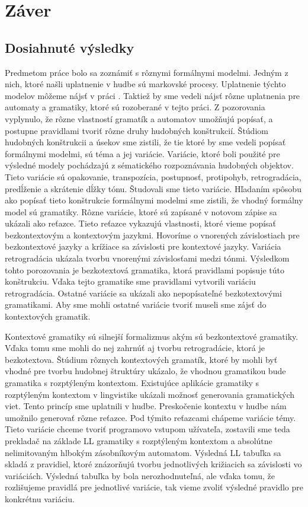\chapter{Záver}
\label{chap:end}
\section{Dosiahnuté výsledky}
Predmetom práce bolo sa zoznámiť s rôznymi formálnymi modelmi. Jedným z nich, ktoré našli uplatnenie v hudbe sú markovské procesy. Uplatnenie týchto modelov môžeme nájsť v práci \cite{afrpub}. Taktiež by sme vedeli nájsť rôzne uplatnenia pre automaty a gramatiky, ktoré sú rozoberané v tejto práci. Z pozorovania vyplynulo, že rôzne vlastností gramatík a automatov umožňujú popísať, a postupne pravidlami tvoriť rôzne druhy hudobných konštrukcií. 
Štúdiom hudobných konštrukcii a úsekov sme zistili, že tie ktoré by sme vedeli popísať formálnymi modelmi, sú téma a jej variácie. Variácie, ktoré boli použité pre výsledné modely pochádzajú z sématického rozpoznávania hudobných objektov. Tieto variácie sú opakovanie, transpozícia, postupnosť, protipohyb, retrogradácia, predĺženie a skrátenie dĺžky tónu. Študovali sme tieto variácie. Hľadaním spôsobu ako popísať tieto konštrukcie formálnymi modelmi sme zistili, že vhodný formálny model sú gramatiky. Rôzne variácie, ktoré sú zapísané v notovom zápise sa ukázali ako reťazce. Tieto reťazce vykazujú vlastnosti, ktoré vieme popísať bezkontextovým a kontextovým jazykmi. Hovoríme o vnorených závislostiach pre bezkontextové jazyky a krížiace sa závislosti pre kontextové jazyky. Variácia retrogradácia ukázala tvorbu vnorenými závislosťami medzi tónmi. Výsledkom tohto porozovania je bezkotextová gramatika, ktorá pravidlami popisuje túto konštrukciu. Vďaka tejto gramatike sme pravidlami vytvorili variáciu retrogradácia. Ostatné variácie sa ukázali ako nepopísateľné bezkotextovými gramatikami. Aby sme mohli ostatné variácie tvoriť museli sme zájsť do kontextových gramatik.

Kontextové gramatiky sú silnejší formalizmus akým sú bezkontextové gramatiky. Vďaka tomu sme mohli do nej zahrnúť aj tvorbu retrogradácie, ktorá je bezkotextova. Štúdium rôznych kontextových gramatík, ktoré by mohli byť vhodné pre tvorbu hudobnej štruktúry ukázalo, že vhodnou gramatikou bude gramatika s rozptýleným kontextom. Existujúce aplikácie gramatiky s rozptýleným kontextom v lingvistike ukázali možnosť generovania gramatických viet. Tento princíp sme uplatnili v hudbe. Preskočenie kontextu v hudbe nám umožnilo generovať rôzne reťazce. Pod týmito reťazcami chápeme variácie témy. Tieto variácie chceme tvoriť programovo vstupom užívateľa, zostavili sme teda prekladač na základe LL gramatiky s rozptýleným kontextom a absolútne nelimitovaným hlbokým zásobníkovým automatom. Výsledná LL tabuľka sa skladá z pravidiel, ktoré znázorňujú tvorbu jednotlivých križiacich sa závislosti vo variáciách. Výsledná tabuľka by bola nerozhodnuteľná, ale vďaka tomu, že rozlišujeme pravidlá pre jednotlivé variácie, tak vieme zvoliť výsledné pravidlo pre konkrétnu variáciu.

